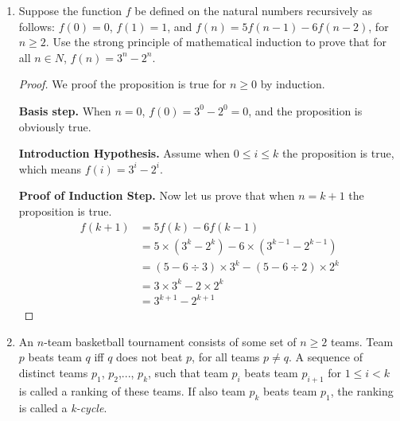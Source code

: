 \documentclass[12pt,a4paper]{article}
\theoremstyle{definition}
\begin{document}
\begin{enumerate}
\begin{proof}
    However, we have
    \begin{align*}
     k &= k-1+1\\
    &=i_{k-1} \times 2 + j_{k-1}\times3 + 3 - 2\\
    &=(i_{k-1}-1) \times 2 + (j_{k-1}+1)\times3
    \end{align*}
    
    and 
    \begin{align*}
     k &= k-1+1\\
    &=i_{k-1} \times 2 + j_{k-1}\times3 + 2 \times 2 - 3\\
    &=(i_{k-1}+2) \times 2 + (j_{k-1}-1)\times3
    \end{align*}
    
    Since at least one of $i_{k-1}$ and $j_{k-1}$ is not $0$, we can make sure $k$ can be written in that form as well. We have derived a contradiction, which allows us to conclude that our original assumption is false.   
    \end{proof}

    \item
    Suppose the function $f$ be defined on the natural numbers recursively as follows: $f(0)=0$, $f(1)=1$, and $f(n)=5f(n-1)-6f(n-2)$, for $n\geq 2$. Use the strong principle of mathematical induction to prove that for all $n\in N$, $f(n)=3^n-2^n$. 
    \begin{proof}
        We proof the proposition is true for $n \geqslant 0$ by induction.
        
        \textbf{Basis step.} When $n = 0$, $f(0) = 3^0-2^0 = 0$, and the proposition is obviously true.
        
        \textbf{Introduction Hypothesis.} Assume when $0 \leqslant i \leqslant k$ the proposition is true, which means $f(i)=3^i-2^i$.
        
        \textbf{Proof of Induction Step.} Now let us prove that when $n=k+1$ the proposition is true.
        \begin{align*}
        f(k+1)&= 5f(k)-6f(k-1)\\
        &= 5\times(3^k-2^k) - 6\times(3^{k-1}-2^{k-1})\\
        &= (5-6\div3)\times3^k - (5-6\div2)\times2^k\\
        &=3\times3^k-2\times2^k\\
        &=3^{k+1}-2^{k+1}
        \end{align*}
    \end{proof}

    \item
    An $n$-team basketball tournament consists of some set of $n\geq2$ teams. Team $p$ beats team $q$ iff $q$
does not beat $p$, for all teams $p\neq q$. A sequence of distinct teams $p_{1}$, $p_{2}$,..., $p_{k}$, such that team $p_{i}$ beats team $p_{i+1}$ for $1\leq i<k$ is called a ranking of these teams. If also team $p_{k}$ beats team $p_{1}$, the ranking is called a \emph{k-cycle}. 


\end{enumerate}
\end{document}

